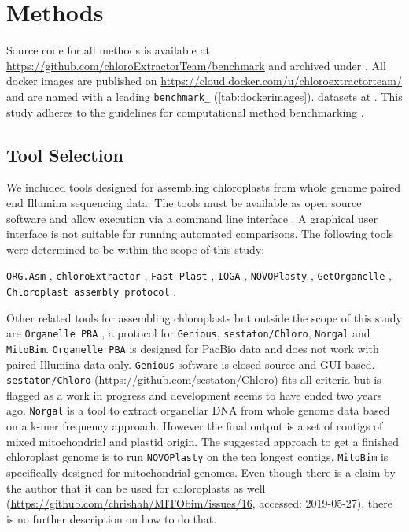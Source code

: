 \documentclass{bmcart}
\newcommand{\formatprogramnames}[1]{\texttt{#1}}
\newcommand{\ce}{\formatprogramnames{chloroExtractor}}
\newcommand{\oa}{\formatprogramnames{ORG.Asm}}
\newcommand{\fp}{\formatprogramnames{Fast-Plast}}
\newcommand{\ioga}{\formatprogramnames{IOGA}}
\newcommand{\np}{\formatprogramnames{NOVOPlasty}}
\newcommand{\go}{\formatprogramnames{GetOrganelle}}
\newcommand{\cassp}{\formatprogramnames{Chloroplast assembly protocol}}
\begin{document}
\section*{Methods}
Source code for all methods is available at \url{https://github.com/chloroExtractorTeam/benchmark} and archived under .
All docker images are published on \url{https://cloud.docker.com/u/chloroextractorteam/} and are named with a leading \texttt{benchmark\_} (\cref{tab:dockerimages}).
datasets at .
This study adheres to the guidelines for computational method benchmarking \cite{weber_essential_2018}.

\subsection*{Tool Selection}

We included tools designed for assembling chloroplasts from whole genome paired end Illumina sequencing data. The tools must be available as open source software and allow execution via a command line interface . A graphical user interface is not suitable for
running automated comparisons. The following tools were determined to be within the scope of this study:

\oa{} \cite{coissac_barcodes_2016}, 
\ce{} \cite{j_ankenbrand_chloroextractor:_2018}, 
\fp{} \cite{mckain__fast-plast_2017}, 
\ioga{} \cite{bakker_herbarium_2016}, 
\np{} \cite{dierckxsens_novoplasty:_2017}, 
\go{} \cite{jin_getorganelle:_2018}, 
\cassp{} \cite{sancho_comparative_2018}.

Other related tools for assembling chloroplasts but outside the scope of this study are \texttt{Organelle PBA} \cite{Soorni2017}, a protocol for \texttt{Genious}, \texttt{sestaton/Chloro}, \texttt{Norgal} and \texttt{MitoBim}.
\texttt{Organelle PBA} is designed for PacBio data and does not work with paired Illumina data only. \texttt{Genious} software  is closed source and GUI based. \texttt{sestaton/Chloro} (\url{https://github.com/sestaton/Chloro}) fits all criteria but is flagged as a work in progress and development seems to have ended two years ago.
\texttt{Norgal} \cite{Al-Nakeeb2017} is a tool to extract organellar DNA from whole genome data based on a k-mer frequency approach. However the final output is a set of contigs of mixed mitochondrial and plastid origin. The suggested approach to get a finished chloroplast genome is to run \np{} on the ten longest contigs.
\texttt{MitoBim} is specifically designed for mitochondrial genomes. Even though there is a claim by the author that it can be used for chloroplasts as well (\url{https://github.com/chrishah/MITObim/issues/16}, accessed: 2019-05-27), there is no further description on how to do that. 
\end{document}
